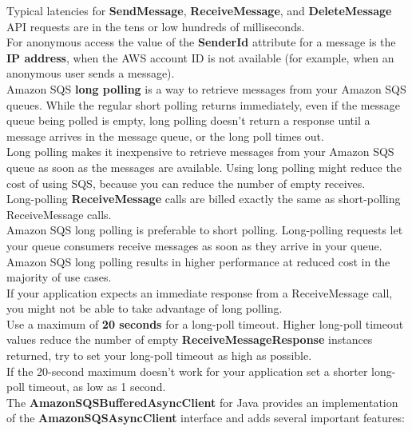 \documentclass[12pt, letterpaper, twoside]{article}
\begin{document}
Typical latencies for \textbf{SendMessage}, \textbf{ReceiveMessage}, and \textbf{DeleteMessage} API requests 
are in the tens or low hundreds of milliseconds.\\

For anonymous access the value of the \textbf{SenderId} attribute for a message is the \textbf{IP address}, 
when the AWS account ID is not available (for example, when an anonymous user sends a message).\\

Amazon SQS \textbf{long polling} is a way to retrieve messages from your Amazon SQS queues.
While the regular short polling returns immediately, even if the message queue being polled is empty, 
long polling doesn’t return a response until a message arrives in the message queue, or the long poll times out.\\
Long polling makes it inexpensive to retrieve messages from your Amazon SQS queue as soon as the messages are 
available. Using long polling might reduce the cost of using SQS, because you can reduce the number of empty receives.\\

Long-polling \textbf{ReceiveMessage} calls are billed exactly the same as short-polling ReceiveMessage calls.\\

Amazon SQS long polling is preferable to short polling. Long-polling requests let your queue consumers receive 
messages as soon as they arrive in your queue.\\
Amazon SQS long polling results in higher performance at reduced cost in the majority of use cases.\\
If your application expects an immediate response from a ReceiveMessage call, you might not be able to 
take advantage of long polling.\\

Use a maximum of \textbf{20 seconds} for a long-poll timeout. Higher long-poll timeout values reduce the number 
of empty \textbf{ReceiveMessageResponse} instances returned, try to set your long-poll timeout as high as possible.\\
If the 20-second maximum doesn't work for your application set a shorter long-poll timeout, as low as 1 second.\\

The \textbf{AmazonSQSBufferedAsyncClient} for Java provides an implementation of the \textbf{AmazonSQSAsyncClient} 
interface and adds several important features:
\end{document}

